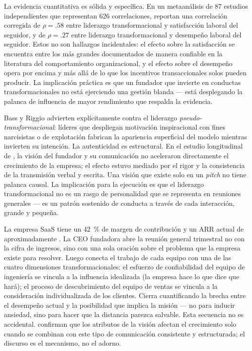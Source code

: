 La evidencia cuantitativa es sólida y específica. En un metaanálisis de \num{87} estudios
independientes que representan 626 correlaciones, \textcite{judge2004transformational} reportan
una correlación corregida de \(\rho = .58\) entre liderazgo transformacional y satisfacción
laboral del seguidor, y de \(\rho = .27\) entre liderazgo transformacional y desempeño laboral
del seguidor. Estos no son hallazgos incidentales: el efecto sobre la satisfacción se encuentra
entre los más grandes documentados de manera confiable en la literatura del comportamiento
organizacional, y el efecto sobre el desempeño opera por encima y más allá de lo que los
incentivos transaccionales solos pueden producir. La implicación práctica es que un fundador que
invierte en conductas transformacionales no está ejerciendo una gestión blanda --- está desplegando
la palanca de influencia de mayor rendimiento que respalda la evidencia.

Bass y Riggio advierten explícitamente contra el liderazgo \emph{pseudo-transformacional}: líderes
que despliegan motivación inspiracional con fines narcisistas o de explotación fabrican la
apariencia superficial del modelo mientras invierten su intención. La autenticidad es estructural.
En el estudio longitudinal de \textcite{baum1998longitudinal}, la visión del fundador y su
comunicación no aceleraron directamente el crecimiento de la empresa; el efecto estuvo mediado
por el rigor y la consistencia de la transmisión verbal y escrita. Una visión que existe solo en
un \emph{pitch} no tiene palanca causal. La implicación para la ejecución es que el liderazgo
transformacional no es un rasgo de personalidad que se representa en reuniones generales --- es
un patrón sostenido de conducta a través de cada interacción, grande y pequeña.

\begin{example}
La empresa SaaS tiene un \qty{42}{\percent} de margen de contribución y un ARR actual de
aproximadamente . La CEO fundadora abre la reunión general trimestral no con la
cifra de ingresos, sino con una sola oración sobre el problema que la empresa existe para
resolver. Luego conecta el trabajo de cada equipo con una de las cuatro dimensiones
transformacionales: el esfuerzo de confiabilidad del equipo de ingeniería se vincula a la
influencia idealizada (la empresa hace lo que dice que hará); el proceso de descubrimiento del
equipo de ventas se vincula a la consideración individualizada de los clientes. Cierra
cuantificando la brecha entre el desempeño actual y la posibilidad que implica la misión --- no
para inducir ansiedad, sino para hacer que la distancia parezca salvable. Esta secuencia no es
accidental. \textcite{baum1998longitudinal} confirman que los atributos de la visión afectan el
crecimiento solo cuando se combinan con este tipo de comunicación consistente y estructurada; el
discurso es el mecanismo, no el adorno.
\end{example}

